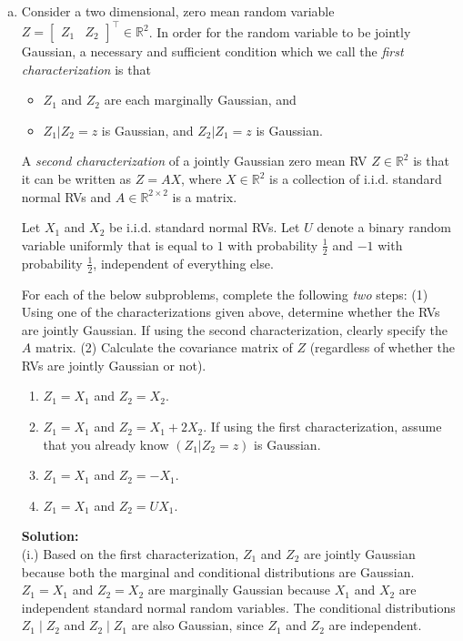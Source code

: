 \documentclass{article}
\newenvironment{solution}{\color{blue} \smallskip \textbf{Solution:}}{}
\begin{document}
\begin{enumerate}[(a)]
    \item Consider a two dimensional, zero mean random variable $Z = \begin{bmatrix} Z_1 & Z_2 \end{bmatrix}^\top \in \mathbb{R}^2$. 
    In order for the random variable to be jointly Gaussian, a necessary and sufficient condition which we call the \textit{first characterization} is that 
    \begin{itemize}
        \item $Z_1$ and $Z_2$ are each marginally Gaussian, and
        \item $Z_1 | Z_2 = z$ is Gaussian, and $Z_2 | Z_1 = z$ is Gaussian.
    \end{itemize}

    A \textit{second characterization} of a jointly Gaussian zero mean RV $Z \in \mathbb{R}^2$ is that it can be written as $Z = A X$, where $X \in \mathbb{R}^2$ is a collection of i.i.d. standard normal RVs and $A \in \mathbb{R}^{2 \times 2}$ is a matrix.

    Let $X_1$ and $X_2$ be i.i.d. standard normal RVs. Let $U$ denote a binary random variable uniformly that is equal to $1$ with probability $\frac{1}{2}$ and $-1$ with probability $\frac{1}{2}$, independent of everything else. 

    For each of the below subproblems, complete the following \emph{two} steps:
    (1) Using one of the characterizations given above, determine whether the RVs are jointly Gaussian. If using the second characterization, clearly specify the $A$ matrix. 
    (2) Calculate the covariance matrix of $Z$ (regardless of whether the RVs are jointly Gaussian or not).

    \begin{enumerate}[(i.)]
        \item $Z_1 = X_1$ and $Z_2 = X_2$.
        \item $Z_1 = X_1$ and $Z_2 = X_1 + 2X_2$. If using the first characterization, assume that you already know $(Z_1 | Z_2 = z)$ is Gaussian. %
        \item $Z_1 = X_1$ and $Z_2 = -X_1$.
        \item $Z_1 = X_1$ and $Z_2 = U X_1$.
    \end{enumerate}

    \begin{solution} \\
        (i.)
Based on the first characterization, \(Z_1\) and \(Z_2\) are jointly Gaussian because both the marginal and conditional distributions are Gaussian. \(Z_1 = X_1\) and \(Z_2 = X_2\) are marginally Gaussian because \(X_1\) and \(X_2\) are independent standard normal random variables. The conditional distributions \(Z_1 \mid Z_2\) and \(Z_2 \mid Z_1\) are also Gaussian, since \(Z_1\) and \(Z_2\) are independent.\\


\end{solution}
\end{enumerate}
\end{document}
